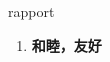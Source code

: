
\begin{frame}
{\huge rapport}
\begin{center}
\begin{enumerate}\Large
  \item \textbf{和睦，友好}
\end{enumerate}
\end{center}
\end{frame}
